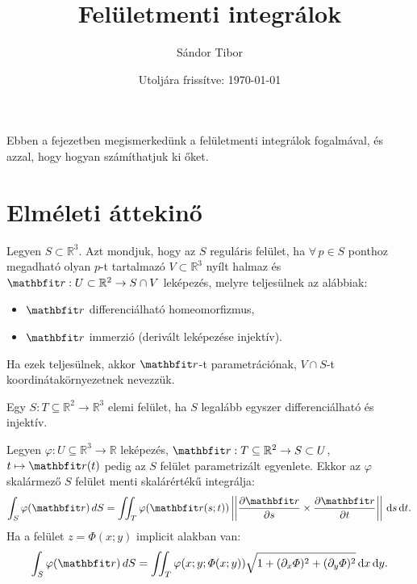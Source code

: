 \documentclass[lang=magyar]{math-handout}
\title{Felületmenti integrálok}
\date{Utoljára frissítve: \today}
\author{Sándor Tibor}
\begin{document}
\allowdisplaybreaks

\maketitle

\vspace{1em}

\begin{summary}
  Ebben a fejezetben megismerkedünk a felületmenti integrálok fogalmával, és
  azzal, hogy hogyan számíthatjuk ki őket.
\end{summary}

\vspace{-1em}

\section{Elméleti áttekinő}

\vspace{1em}

\begin{definition}
  Legyen $S \subset  \mathbb R^3$. Azt mondjuk, hogy az $S$ reguláris felület,
  ha $\forall \, p \in S$ ponthoz megadható olyan $p$-t tartalmazó $V \subset
    \mathbb R^3$ nyílt halmaz és $\rvec r : U \subset \mathbb R^2 \rightarrow S
    \cap V$ leképezés, melyre teljesülnek az alábbiak:
  \begin{itemize}
    \item $\rvec r$ differenciálható homeomorfizmus,

    \item $\rvec r$ immerzió (derivált leképezése injektív).
  \end{itemize}
  Ha ezek teljesülnek, akkor $\rvec r$-t parametrációnak,
  $V \cap S$-t  koordinátakörnyezetnek nevezzük.
\end{definition}

\vfill

\begin{definition}
  Egy $S: T \subseteq \mathbb R^2 \rightarrow \mathbb R^3$ elemi felület, ha
  $S$ legalább egyszer differenciálható és injektív.
\end{definition}

\vfill

\begin{definition}
  Legyen $\varphi: U \subseteq \mathbb R^3 \rightarrow \mathbb R$ leképezés,
  $\rvec r: T \subseteq \mathbb R^2 \rightarrow S \subset U$, $t \mapsto
    \rvec r(t)$ pedig az $S$ felület parametrizált egyenlete. Ekkor az $\varphi$
  skalármező $S$ felület menti skalárértékű integrálja:
  \[
    \int_S \varphi (\rvec r) \, dS =
    \iint_T \varphi (\rvec r(s; t))
    \norma{\pdv{\rvec r}{s} \times \pdv{\rvec r}{t}}
    \, \diff s \, \diff t
    \text.
  \]
  Ha a felület $z = \varPhi(x; y)$ implicit alakban van:
  \[
    \int_S \varphi (\rvec r) \, dS =
    \iint_T \varphi (x; y; \varPhi(x;y))
    \sqrt{1 + (\partial_x \varPhi)^2 + (\partial_y \varPhi)^2}
    \, \diff x \, \diff y
    \text.
  \]
\end{definition}
\end{document}
